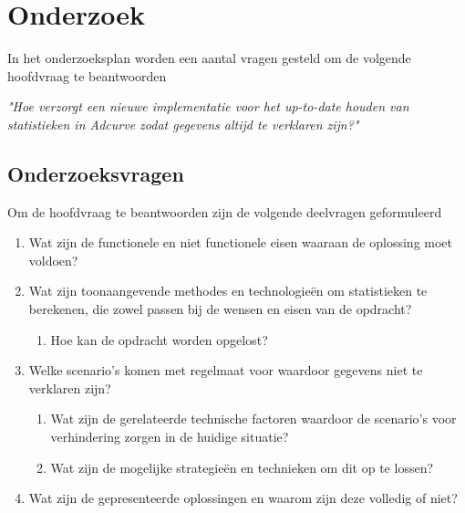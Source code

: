 \chapter{Onderzoek}

In het onderzoeksplan worden een aantal vragen gesteld om de volgende hoofdvraag te beantwoorden

{\large \textit{"Hoe verzorgt een nieuwe implementatie voor het up-to-date houden van statistieken in Adcurve zodat gegevens altijd te verklaren zijn?"}}
\medskip

\section{Onderzoeksvragen}

Om de hoofdvraag te beantwoorden zijn de volgende deelvragen geformuleerd

\begin{enumerate}
\item Wat zijn de functionele en niet functionele eisen waaraan de oplossing moet voldoen?
\item Wat zijn toonaangevende methodes en technologieën om statistieken te berekenen, die zowel passen bij de wensen en eisen van de opdracht?
\begin{enumerate}
    \item Hoe kan de opdracht worden opgelost?
\end{enumerate}
\item Welke scenario's komen met regelmaat voor waardoor gegevens niet te verklaren zijn?
\begin{enumerate}
    \item Wat zijn de gerelateerde technische factoren waardoor de scenario's voor verhindering zorgen in de huidige situatie?
    \item Wat zijn de mogelijke strategieën en technieken om dit op te lossen?
\end{enumerate}

\item Wat zijn de gepresenteerde oplossingen en waarom zijn deze volledig of niet?
\end{enumerate}

